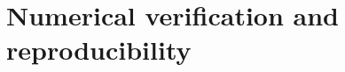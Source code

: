 \documentclass[10pt,a4paper]{article}
\begin{document}
\appendix
\section{Numerical verification and reproducibility}


\end{document}
